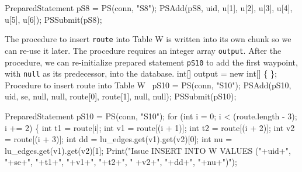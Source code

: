 \documentclass{article}
\def\nwendcode{\endtrivlist \endgroup}      %
\let\nwdocspar=\par
\theoremstyle{definition}                   %
\begin{document}
PreparedStatement pS8 = PS(conn, "S8");
PSAdd(pS8, uid, u[1], u[2], u[3], u[4], u[5], u[6]);
PSSubmit(pS8);
\nwendcode{}\nwdocspar
The procedure to insert {\tt{}route} into Table W is written into its own chunk so
we can re-use it later. The procedure requires an integer array {\tt{}output}.
After the procedure, we can re-initialize prepared statement {\tt{}pS10} to add the first
waypoint, with {\tt{}null} as its predecessor, into the database.
\nwenddocs{}\endmoddef{}
int[] output = new int[] \{ \};
\LA{}Procedure to insert \code{}route\edoc{} into Table W~{\nwtagstyle{}}\RA{}
pS10 = PS(conn, "S10");
PSAdd(pS10, uid, se, null, null, route[0], route[1], null, null);
PSSubmit(pS10);
\nwendcode{}\nwdocspar
\nwenddocs{}\endmoddef{}
PreparedStatement pS10 = PS(conn, "S10");
for (int i = 0; i < (route.length - 3); i += 2) \{
  int t1 = route[i];
  int v1 = route[(i + 1)];
  int t2 = route[(i + 2)];
  int v2 = route[(i + 3)];
  int dd = lu_edges.get(v1).get(v2)[0];
  int nu = lu_edges.get(v1).get(v2)[1];
  Print("Issue INSERT INTO W VALUES ("+uid+", "+se+", "+t1+", "+v1+", "+t2+", "
    +v2+", "+dd+", "+nu+")");
\end{document}
